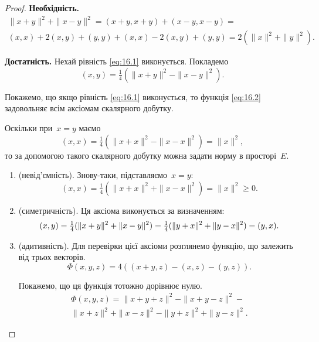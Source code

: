 \begin{proof}
    \textbf{Необхідність.}
    \begin{multline*}
        \|x + y\|^2 + \|x - y\|^2 =
        (x + y, x + y) + (x - y, x - y) = \\
        (x, x) + 2 (x, y) + (y, y) + (x, x) - 2 (x, y) + (y, y) =
        2 (\|x\|^2 + \|y\|^2).
    \end{multline*}
    
    \textbf{Достатність.} Нехай рівність \eqref{eq:16.1} виконується. Покладемо
    \begin{equation}
        \label{eq:16.2}
        (x, y) = \tfrac{1}{4} ( \|x + y\|^2 - \|x - y\|^2).
    \end{equation}

    Покажемо, що якщо рівність \eqref{eq:16.1} виконується, то функція \eqref{eq:16.2} задовольняє всім аксіомам скалярного добутку.

    Оскільки при~$x = y$ маємо
    \begin{equation*}
        (x, x) = \tfrac{1}{4} ( \|x + x\|^2 - \|x - x\|^2) = \|x\|^2,
    \end{equation*}
    то за допомогою такого скалярного добутку можна задати норму в просторі~$E$.
    
    \begin{enumerate}
        \item (невід’ємність). Знову-таки, підставляємо~$x = y$:
        \begin{equation*}
            (x, x) = \tfrac{1}{4} (\|x + x\|^2 + \|x - x\|^2) = \|x\|^2 \ge 0.
        \end{equation*}
        
        \item (симетричність). Ця аксіома виконується за визначенням:
        \begin{equation*}
            (x, y) = \tfrac{1}{4} (\|x + y\|^2 + \|x - y\|^2) = \\
            \tfrac{1}{4} (\|y + x\|^2 + \|y - x\|^2) = (y, x).
        \end{equation*}
        
        \item (адитивність). Для перевірки цієї аксіоми розглянемо функцію, що залежить від трьох векторів.
        \begin{equation*}
            \Phi(x, y, z) = 4 ((x + y, z) - (x, z) - (y, z)).
        \end{equation*}
        
        Покажемо, що ця функція тотожно дорівнює нулю.
        \begin{multline}
            \label{eq:16.3}
            \Phi(x, y, z) = \|x + y + z\|^2 - \|x + y - z\|^2 - \\
            \|x + z\|^2 + \|x - z\|^2 - \|y + z\|^2 + \|y - z\|^2.
        \end{multline}
    

\end{enumerate}
\end{proof}
